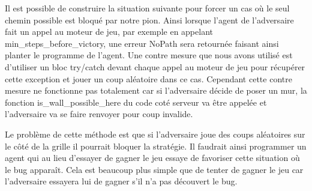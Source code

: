 \documentclass[12pt]{article}
\begin{document}

Il est possible de construire la situation suivante pour forcer un cas où le seul chemin possible est bloqué par notre pion. Ainsi lorsque l'agent de l'adversaire fait un appel au moteur de jeu, par exemple en appelant min\_steps\_before\_victory, une erreur NoPath sera retournée faisant ainsi planter le programme de l'agent. Une contre mesure que nous avons utilisé est d'utiliser un bloc try/catch devant chaque appel au moteur de jeu pour récupérer cette exception et jouer un coup aléatoire dans ce cas. Cependant cette contre mesure ne fonctionne pas totalement car si l'adversaire décide de poser un mur, la fonction is\_wall\_possible\_here du code coté serveur va être appelée et l'adversaire va se faire renvoyer pour coup invalide. 

Le problème de cette méthode est que si l'adversaire joue des coups aléatoires sur le côté de la grille il pourrait bloquer la stratégie. Il faudrait ainsi programmer un agent qui au lieu d'essayer de gagner le jeu essaye de favoriser cette situation où le bug apparaît. Cela est beaucoup plus simple que de tenter de gagner le jeu car l'adversaire essayera lui de gagner s'il n'a pas découvert le bug. 
\end{document}
